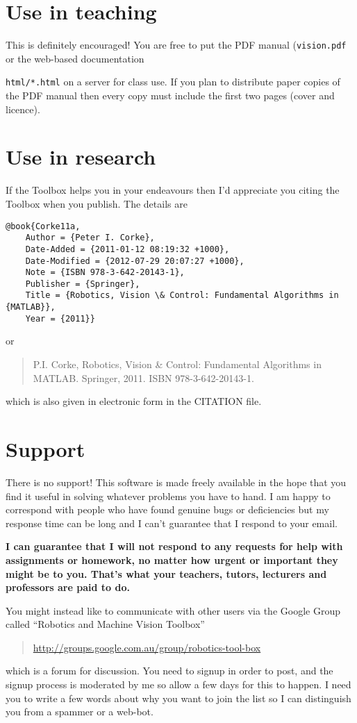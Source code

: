 \documentclass[a4paper]{report}
\begin{document}
\section{Use in teaching}
This is definitely encouraged!
You are free to put the PDF manual (\texttt{vision.pdf} or the web-based documentation {\texttt{html/*.html} on a server for class
use.
If you plan to distribute paper copies of the PDF manual then every copy must include the first two pages (cover and licence).

\section{Use in research}
If the Toolbox helps you in your endeavours then I'd appreciate you citing the Toolbox when you publish.
The details are
\begin{verbatim}
@book{Corke11a,
    Author = {Peter I. Corke},
    Date-Added = {2011-01-12 08:19:32 +1000},
    Date-Modified = {2012-07-29 20:07:27 +1000},
    Note = {ISBN 978-3-642-20143-1},
    Publisher = {Springer},
    Title = {Robotics, Vision \& Control: Fundamental Algorithms in {MATLAB}},
    Year = {2011}}
\end{verbatim}
or
\begin{quote}
P.I. Corke, Robotics, Vision \& Control: Fundamental Algorithms in MATLAB. Springer, 2011. ISBN 978-3-642-20143-1.
\end{quote}
which is also given in electronic form in the CITATION file.

\section{Support}
There is no support!  This software is made freely available in the hope that you find it useful in solving whatever problems
you have to hand.
I am happy to correspond with people who have found genuine
bugs or deficiencies but my response time can be long and I can't guarantee that I respond to your email.

\textbf{I can guarantee that I will not respond to any requests for help with assignments or homework, no matter
how urgent or important they might be to you.  That's what your teachers, tutors, lecturers and professors are paid to do.}

You might instead like to communicate with other users via 
the Google Group called ``Robotics and Machine Vision Toolbox'' 
\begin{quote}
\url{http://groups.google.com.au/group/robotics-tool-box}
\end{quote}
which is a forum for discussion.
You need to signup in order to post, and the signup process is moderated by me so allow a few
days for this to happen.  I need you to write a few words about why you want to join the list
so I can distinguish you from a spammer or a web-bot.

}
\end{document}

